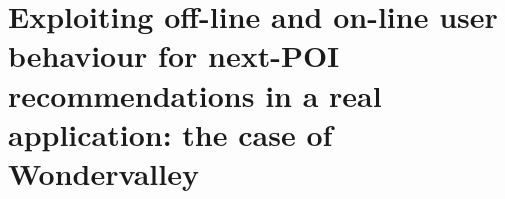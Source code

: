 \chapter{Exploiting off-line and on-line user behaviour for next-POI recommendations in a real application: the case of Wondervalley}
\label{cha:wondervalley}
\ifpdf
    \graphicspath{{Chapter7/Figs/Raster/}{Chapter7/Figs/PDF/}{Chapter7/Figs/}}
\else
    \graphicspath{{Chapter7/Figs/Vector/}{Chapter7/Figs/}}
\fi

